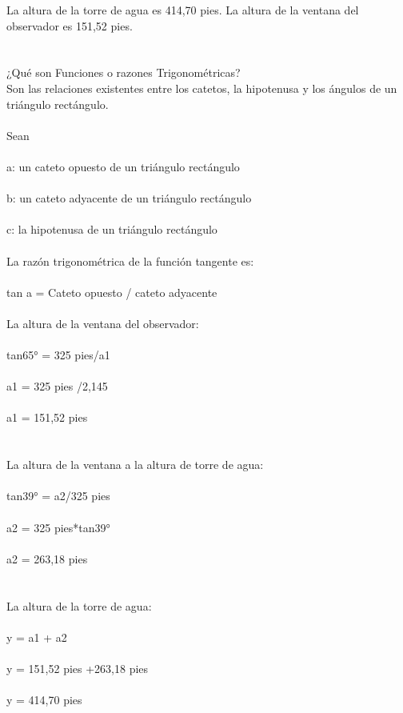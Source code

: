 \documentclass[11pt]{article}
\begin{document}
 La altura de la torre de agua es 414,70 pies. La altura de la ventana del observador es  151,52 pies.\\
\\
\\
¿Qué son Funciones o razones Trigonométricas?\\
Son las relaciones existentes entre los catetos, la hipotenusa y los ángulos de un triángulo rectángulo.\\
\\
Sean\\
\\
a: un cateto opuesto de un triángulo rectángulo\\
\\
b: un cateto adyacente de un triángulo rectángulo\\
\\
c: la hipotenusa de un triángulo rectángulo\\
\\
La razón trigonométrica de la función tangente es:\\
\\
tan a = Cateto opuesto / cateto adyacente\\
\\
La altura de la ventana del observador:\\
\\
tan65° = 325 pies/a1\\
\\
a1 = 325 pies /2,145\\
\\
a1 = 151,52 pies\\
\\
\\
La altura de la ventana a la altura de torre de agua:\\
\\
tan39° = a2/325 pies\\
\\
a2 = 325 pies*tan39°\\
\\
a2 = 263,18 pies\\
\\
\\
La altura de la torre de agua:\\
\\
y = a1 + a2\\
\\
y = 151,52 pies +263,18 pies\\
\\
y = 414,70 pies\\
\\
\end{document}
